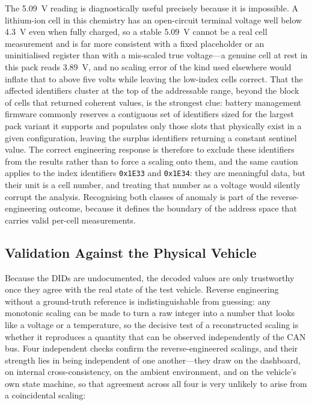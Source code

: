 \documentclass[11pt,a4paper,oneside,parskip=half]{scrreprt}
\providecommand{\hex}{}\renewcommand{\hex}[1]{\texttt{0x#1}}
\begin{document}
The 5.09~V reading is diagnostically useful precisely because it is impossible. A lithium-ion cell in this chemistry has an open-circuit terminal voltage well below 4.3~V even when fully charged, so a stable 5.09~V cannot be a real cell measurement and is far more consistent with a fixed placeholder or an uninitialised register than with a mis-scaled true voltage---a genuine cell at rest in this pack reads 3.89~V, and no scaling error of the kind used elsewhere would inflate that to above five volts while leaving the low-index cells correct. That the affected identifiers cluster at the top of the addressable range, beyond the block of cells that returned coherent values, is the strongest clue: battery management firmware commonly reserves a contiguous set of identifiers sized for the largest pack variant it supports and populates only those slots that physically exist in a given configuration, leaving the surplus identifiers returning a constant sentinel value. The correct engineering response is therefore to exclude these identifiers from the results rather than to force a scaling onto them, and the same caution applies to the index identifiers \hex{1E33} and \hex{1E34}: they are meaningful data, but their unit is a cell number, and treating that number as a voltage would silently corrupt the analysis. Recognising both classes of anomaly is part of the reverse-engineering outcome, because it defines the boundary of the address space that carries valid per-cell measurements.

\subsection{Validation Against the Physical Vehicle}
Because the DIDs are undocumented, the decoded values are only trustworthy once they agree with the real state of the test vehicle. Reverse engineering without a ground-truth reference is indistinguishable from guessing: any monotonic scaling can be made to turn a raw integer into a number that looks like a voltage or a temperature, so the decisive test of a reconstructed scaling is whether it reproduces a quantity that can be observed independently of the CAN bus. Four independent checks confirm the reverse-engineered scalings, and their strength lies in being independent of one another---they draw on the dashboard, on internal cross-consistency, on the ambient environment, and on the vehicle's own state machine, so that agreement across all four is very unlikely to arise from a coincidental scaling:
\end{document}
